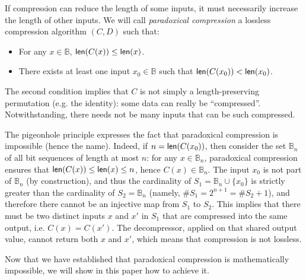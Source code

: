 \documentclass{llncs}
\newcommand{\bB}{\mathbb{B}}
\newcommand{\bitlength}{\text{\textsf{len}}}
\begin{document}
If compression can reduce the length of some inputs, it must necessarily
increase the length of other inputs. We will call \emph{paradoxical
compression} a lossless compression algorithm $(C, D)$ such that:
\begin{itemize}

    \item For any $x \in \bB$, $\bitlength(C(x)) \leq \bitlength(x)$.

    \item There exists at least one input $x_0 \in \bB$ such that
    $\bitlength(C(x_0)) < \bitlength(x_0)$.

\end{itemize}
The second condition implies that $C$ is not simply a length-preserving
permutation (e.g. the identity): some data can really be ``compressed''.
Notwithstanding, there needs not be many inputs that can be such
compressed.

The pigeonhole principle expresses the fact that paradoxical compression
is impossible (hence the name). Indeed, if $n = \bitlength(C(x_0))$,
then consider the set $\bB_n$ of all bit sequences of length at most
$n$: for any $x \in \bB_n$, paradoxical compression ensures that
$\bitlength(C(x)) \leq \bitlength(x) \leq n$, hence $C(x) \in \bB_n$.
The input $x_0$ is not part of $\bB_n$ (by construction), and thus the
cardinality of $S_1 = \bB_n \cup \{ x_0 \}$ is strictly greater than the
cardinality of $S_2 = \bB_n$ (namely, $\#S_1 = 2^{n+1} = \#S_2 + 1$),
and therefore there cannot be an injective map from $S_1$ to $S_2$. This
implies that there must be two distinct inputs $x$ and $x'$ in $S_1$
that are compressed into the same output, i.e. $C(x) = C(x')$. The
decompressor, applied on that shared output value, cannot return both
$x$ and $x'$, which means that compression is not lossless.

Now that we have established that paradoxical compression is
mathematically impossible, we will show in this paper how to achieve it.
\end{document}
